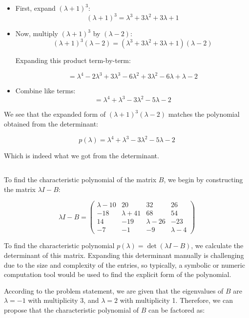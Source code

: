 \documentclass{article}
\begin{document}
\begin{itemize}
    \item First, expand \( (\lambda + 1)^3 \):
          \[
              (\lambda + 1)^3 = \lambda^3 + 3\lambda^2 + 3\lambda + 1
          \]

    \item Now, multiply \( (\lambda + 1)^3 \) by \( (\lambda - 2) \):
          \[
              (\lambda + 1)^3 (\lambda - 2) = (\lambda^3 + 3\lambda^2 + 3\lambda + 1)(\lambda - 2)
          \]

          Expanding this product term-by-term:

          \[
              = \lambda^4 - 2\lambda^3 + 3\lambda^3 - 6\lambda^2 + 3\lambda^2 - 6\lambda + \lambda - 2
          \]

    \item Combine like terms:
          \[
              = \lambda^4 + \lambda^3 - 3\lambda^2 - 5\lambda - 2
          \]
\end{itemize}

We see that the expanded form of \( (\lambda + 1)^3 (\lambda - 2) \) matches the polynomial obtained from the determinant:

\[
    p(\lambda) = \lambda^4 + \lambda^3 - 3\lambda^2 - 5\lambda - 2
\]

Which is indeed what we got from the determinant.
\subsection{}
To find the characteristic polynomial of the matrix \( B \), we begin by constructing the matrix \( \lambda I - B \):

\[
    \lambda I - B = \begin{pmatrix} \lambda - 10 & 20 & 32 & 26 \\ -18 & \lambda + 41 & 68 & 54 \\ 14 & -19 & \lambda - 26 & -23 \\ -7 & -1 & -9 & \lambda - 4 \end{pmatrix}
\]

To find the characteristic polynomial \( p(\lambda) = \det(\lambda I - B) \), we calculate the determinant of this matrix. Expanding this determinant manually is challenging due to the size and complexity of the entries, so typically, a symbolic or numeric computation tool would be used to find the explicit form of the polynomial.

According to the problem statement, we are given that the eigenvalues of \( B \) are \( \lambda = -1 \) with multiplicity 3, and \( \lambda = 2 \) with multiplicity 1. Therefore, we can propose that the characteristic polynomial of \( B \) can be factored as:
\end{document}
